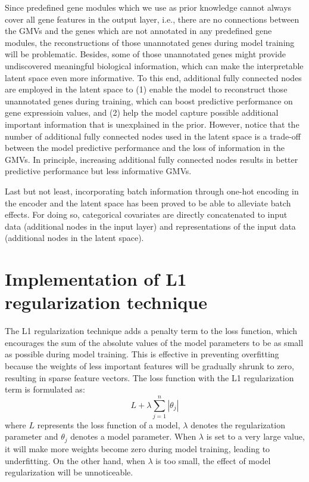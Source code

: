 Since predefined gene modules which we use as prior knowledge cannot always cover all gene features in the output layer, i.e., there are no connections between the GMVs and the genes which are not annotated in any predefined gene modules, the reconstructions of those unannotated genes during model training will be problematic. Besides, some of those unannotated genes might provide undiscovered meaningful biological information, which can make the interpretable latent space even more informative. To this end, additional fully connected nodes are employed in the latent space to (1) enable the model to reconstruct those unannotated genes during training, which can boost predictive performance on gene expressioin values, and (2) help the model capture possible additional important information that is unexplained in the prior. However, notice that the number of additional fully connected nodes used in the latent space is a trade-off between the model predictive performance and the loss of information in the GMVs. In principle, increasing additional fully connected nodes results in better predictive performance but less informative GMVs.

Last but not least, incorporating batch information through one-hot encoding in the encoder and the latent space has been proved to be able to alleviate batch effects\cite{Seninge2021,Lopez2018}. For doing so, categorical covariates are directly concatenated to input data (additional nodes in the input layer) and representations of the input data (additional nodes in the latent space).

\section{Implementation of L1 regularization technique}\label{methods:L1}
The L1 regularization technique\cite{Ng2004} adds a penalty term to the loss function, which encourages the sum of the absolute values of the model parameters to be as small as possible during model training. This is effective in preventing overfitting because the weights of less important features will be gradually shrunk to zero, resulting in sparse feature vectors. The loss function with the L1 regularization term is formulated as:
\begin{equation}
    L + \lambda\sum^{n}_{j=1}|\theta_j|
\end{equation}
where $L$ represents the loss function of a model, $\lambda$ denotes the regularization parameter and $\theta_j$ denotes a model parameter. When $\lambda$ is set to a very large value, it will make more weights become zero during model training, leading to underfitting. On the other hand, when $\lambda$ is too small, the effect of model regularization will be unnoticeable.

